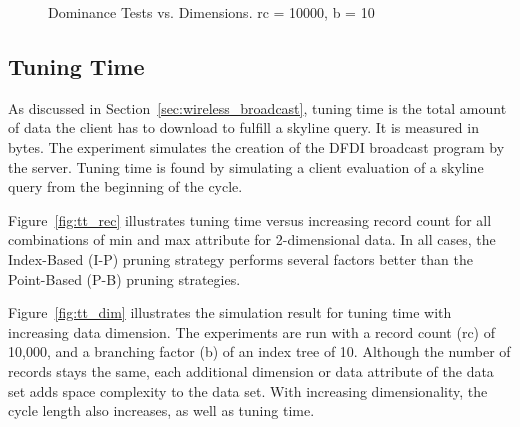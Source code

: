 \begin{figure}
  \centering
  \caption{\small Dominance Tests vs. Dimensions. rc = 10000, b = 10}
  \label{fig:dt_dim}
\end{figure}


\subsection{Tuning Time}\label{sec:exp_tuning_time}

As discussed in Section~\ref{sec:wireless_broadcast}, tuning time
is the total amount of data the client has to download to fulfill
a skyline query. It is measured in bytes. The experiment simulates
the creation of the DFDI broadcast program by the server. Tuning
time is found by simulating a client evaluation of a skyline query
from the beginning of the cycle.

Figure~\ref{fig:tt_rec} illustrates tuning time versus increasing
record count for all combinations of min and max attribute for
2-dimensional data. In all cases, the Index-Based (I-P) pruning
strategy performs several factors better than the Point-Based
(P-B) pruning strategies.

Figure~\ref{fig:tt_dim} illustrates the simulation result for
tuning time with increasing data dimension. The experiments are
run with a record count (rc) of 10,000, and a branching factor (b)
of an index tree of 10. Although the number of records stays the
same, each additional dimension or data attribute of the data set
adds space complexity to the data set. With increasing
dimensionality, the cycle length also increases, as well as tuning
time.

